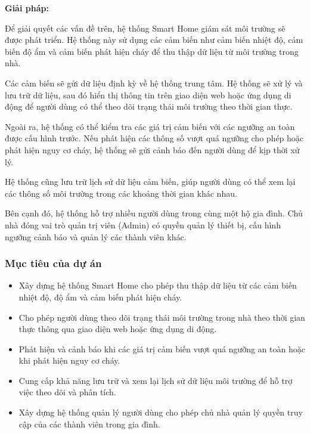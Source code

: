 \documentclass[a4paper,twoside]{article}
\begin{document}
\textbf{Giải pháp:}

Để giải quyết các vấn đề trên, hệ thống Smart Home giám sát môi trường
sẽ được phát triển. Hệ thống này sử dụng các cảm biến như cảm biến
nhiệt độ, cảm biến độ ẩm và cảm biến phát hiện cháy để thu thập dữ liệu
từ môi trường trong nhà.

Các cảm biến sẽ gửi dữ liệu định kỳ về hệ thống trung tâm.
Hệ thống sẽ xử lý và lưu trữ dữ liệu, sau đó hiển thị thông tin
trên giao diện web hoặc ứng dụng di động để người dùng có thể
theo dõi trạng thái môi trường theo thời gian thực.

Ngoài ra, hệ thống có thể kiểm tra các giá trị cảm biến
với các ngưỡng an toàn được cấu hình trước.
Nếu phát hiện các thông số vượt quá ngưỡng cho phép
hoặc phát hiện nguy cơ cháy, hệ thống sẽ gửi cảnh báo
đến người dùng để kịp thời xử lý.

Hệ thống cũng lưu trữ lịch sử dữ liệu cảm biến,
giúp người dùng có thể xem lại các thông số môi trường
trong các khoảng thời gian khác nhau.

Bên cạnh đó, hệ thống hỗ trợ nhiều người dùng
trong cùng một hộ gia đình. Chủ nhà đóng vai trò
quản trị viên (Admin) có quyền quản lý thiết bị,
cấu hình ngưỡng cảnh báo và quản lý các thành viên khác.

\subsubsection{Mục tiêu của dự án}

\begin{itemize}

\item Xây dựng hệ thống Smart Home cho phép thu thập dữ liệu
từ các cảm biến nhiệt độ, độ ẩm và cảm biến phát hiện cháy.

\item Cho phép người dùng theo dõi trạng thái môi trường
trong nhà theo thời gian thực thông qua giao diện web
hoặc ứng dụng di động.

\item Phát hiện và cảnh báo khi các giá trị cảm biến
vượt quá ngưỡng an toàn hoặc khi phát hiện nguy cơ cháy.

\item Cung cấp khả năng lưu trữ và xem lại lịch sử dữ liệu
môi trường để hỗ trợ việc theo dõi và phân tích.

\item Xây dựng hệ thống quản lý người dùng cho phép
chủ nhà quản lý quyền truy cập của các thành viên
trong gia đình.

\end{itemize}
\end{document}
